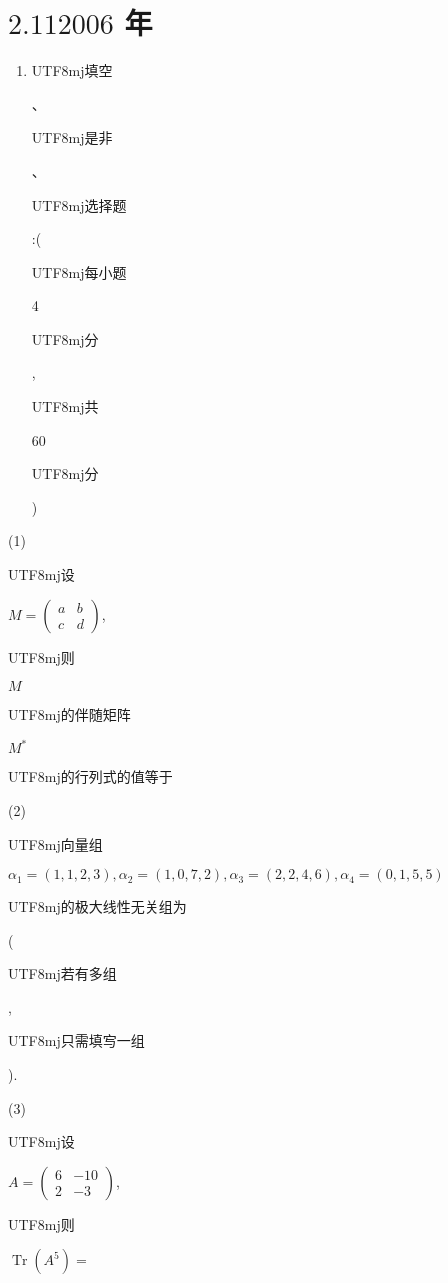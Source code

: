 \documentclass[10pt]{article}
\begin{document}
\section{$2.112006$ 年}
\begin{enumerate}
  \item \begin{CJK}{UTF8}{mj}填空\end{CJK}、\begin{CJK}{UTF8}{mj}是非\end{CJK}、\begin{CJK}{UTF8}{mj}选择题\end{CJK}:(\begin{CJK}{UTF8}{mj}每小题\end{CJK} 4 \begin{CJK}{UTF8}{mj}分\end{CJK}, \begin{CJK}{UTF8}{mj}共\end{CJK} 60 \begin{CJK}{UTF8}{mj}分\end{CJK})
\end{enumerate}
(1) \begin{CJK}{UTF8}{mj}设\end{CJK} $M=\left(\begin{array}{ll}a & b \\ c & d\end{array}\right)$, \begin{CJK}{UTF8}{mj}则\end{CJK} $M$ \begin{CJK}{UTF8}{mj}的伴随矩阵\end{CJK} $M^{*}$ \begin{CJK}{UTF8}{mj}的行列式的值等于\end{CJK}

(2) \begin{CJK}{UTF8}{mj}向量组\end{CJK} $\alpha_{1}=(1,1,2,3), \alpha_{2}=(1,0,7,2), \alpha_{3}=(2,2,4,6), \alpha_{4}=(0,1,5,5)$ \begin{CJK}{UTF8}{mj}的极大线性无关组为\end{CJK} (\begin{CJK}{UTF8}{mj}若有多组\end{CJK}, \begin{CJK}{UTF8}{mj}只需填㝍一组\end{CJK}).

(3) \begin{CJK}{UTF8}{mj}设\end{CJK} $A=\left(\begin{array}{cc}6 & -10 \\ 2 & -3\end{array}\right)$, \begin{CJK}{UTF8}{mj}则\end{CJK} $\operatorname{Tr}\left(A^{5}\right)=$
\end{document}
